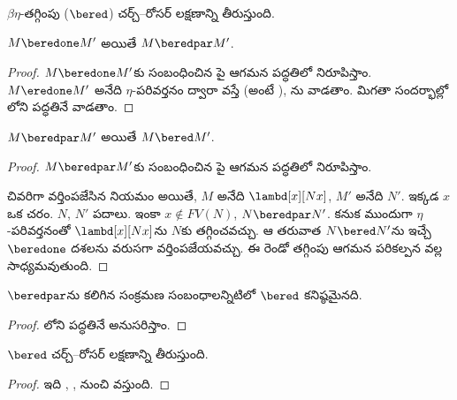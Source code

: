 \documentclass[../../../include/open-logic-section]{subfiles}
\begin{document}


$\beta\eta$-తగ్గింపు ($\bered$) చర్చ్--రోసర్ లక్షణాన్ని తీరుస్తుంది.

\begin{lem}
  $M \beredone M'$ అయితే $M \beredpar M'$.
\end{lem}

\begin{proof}
  $M \beredone M'$కు సంబంధించిన పై
  ఆగమన పద్ధతిలో నిరూపిస్తాం.
  $M \eredone M'$ అనేది $\eta$-పరివర్తనం ద్వారా వస్తే
  (అంటే ),
  ను వాడతాం. మిగతా సందర్భాల్లో
  లోని పద్ధతినే వాడతాం.
\end{proof}

\begin{lem}
  $M \beredpar M'$ అయితే $M \bered M'$.
\end{lem}

\begin{proof} $M \beredpar M'$కు సంబంధించిన
  పై ఆగమన పద్ధతిలో నిరూపిస్తాం.

  చివరిగా వర్తింపజేసిన నియమం  అయితే,
  $M$ అనేది $\lambd[x][Nx]$, $M'$ అనేది $N'$.
  ఇక్కడ $x$ ఒక చరం. $N$, $N'$ పదాలు.
  ఇంకా $x \notin FV(N)$, $N \beredpar N'$. కనుక ముందుగా
  $\eta$-పరివర్తనంతో $\lambd[x][Nx]$ను $N$కు
  తగ్గించవచ్చు. ఆ తరువాత $N \bered N'$ను ఇచ్చే
  $\beredone$ దశలను వరుసగా వర్తింపజేయవచ్చు.
  ఈ రెండో తగ్గింపు ఆగమన పరికల్పన వల్ల సాధ్యమవుతుంది.
\end{proof}

\begin{lem}
  $\beredpar$ను కలిగిన సంక్రమణ సంబంధాలన్నిటిలో $\bered$ కనిష్ఠమైనది.
\end{lem}

\begin{proof}
  లోని పద్ధతినే అనుసరిస్తాం.
\end{proof}

\begin{thm}
  $\bered$ చర్చ్--రోసర్ లక్షణాన్ని తీరుస్తుంది.
\end{thm}

\begin{proof}
  ఇది , ,
   నుంచి వస్తుంది.
\end{proof}
\end{document}
